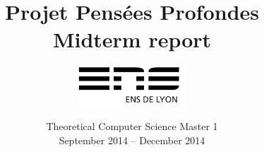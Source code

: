 \documentclass[a4paper,10pt]{report}
\title{Projet Pensées Profondes\\\large Midterm report}
\author{\includegraphics[width=0.3\textwidth]{../logo_ensl.png}}
\date{Theoretical Computer Science Master 1\\September 2014 \--- December 2014}
\begin{document}
\maketitle


\tableofcontents



















\appendix


\nocite{*}
\end{document}

